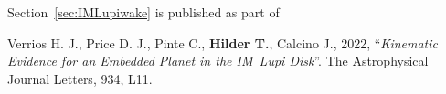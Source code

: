 \hspace{58pt}Section~\ref{sec:IMLupiwake} is published as part of

\begin{myquote}{58pt}
    Verrios H. J., Price D. J., Pinte C., \textbf{Hilder T.}, Calcino J., 2022, ``\textit{Kinematic Evidence for an Embedded Planet in the IM~Lupi Disk}''. The Astrophysical Journal Letters, 934, L11.
\end{myquote}


\vfill

\setlength{\parindent}{15pt}
\newpage
